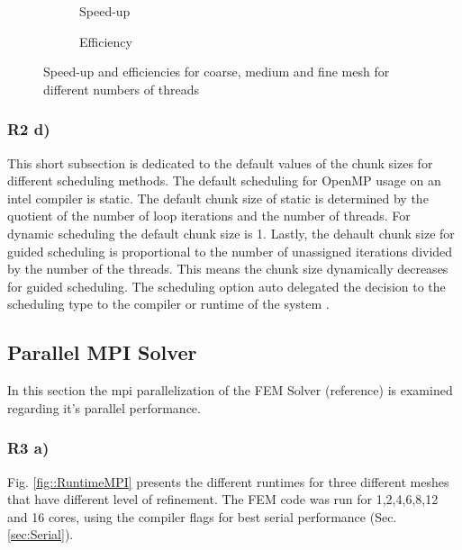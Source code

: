 \documentclass[a4paper, 11pt, oneside]{scrartcl}
\newcommand{\refFig}[1]{Fig. \ref{#1}}
\newcommand{\refSec}[1]{Sec. \ref{#1}}
\begin{document}
\begin{figure}[h!]
	\centering
	\begin{subfigure}{0.49\textwidth}
		\centering
		\resizebox{0.5\width}{!}{}
		\caption{\label{fig::SPOpenMP} Speed-up}
	\end{subfigure}
	\hfill
	\begin{subfigure}{0.49\textwidth}
		\centering
		\resizebox{0.5\width}{!}{}
		\caption{\label{fig::EffOpenMP} Efficiency}
	\end{subfigure}
	\caption{\label{fig::EffSPOpenMP} Speed-up and efficiencies for coarse, medium and fine mesh for different numbers of threads}
\end{figure}

\subsubsection{R2 d)}
This short subsection is dedicated to the default values of the chunk sizes for different scheduling methods. The default scheduling for OpenMP usage on an intel compiler is static. The default chunk size of static is determined by the quotient of the number of loop iterations and the number of threads. For dynamic scheduling the default chunk size is 1. Lastly, the dehault chunk size for guided scheduling is proportional to the number of unassigned iterations divided by the number of the threads. This means the chunk size dynamically decreases for guided scheduling. The scheduling option auto delegated the decision to the scheduling type to the compiler or runtime of the system \cite{spehOpenMPScheduling2016}.

\subsection{Parallel MPI Solver}

In this section the mpi parallelization of the FEM Solver (reference) is examined regarding it's parallel performance. 

\subsubsection{R3 a)}

\refFig{fig::RuntimeMPI} presents the different runtimes for three different meshes that have different level of refinement. The FEM code was run for 1,2,4,6,8,12 and 16 cores, using the compiler flags for best serial performance (\refSec{sec:Serial}). 
\end{document}
